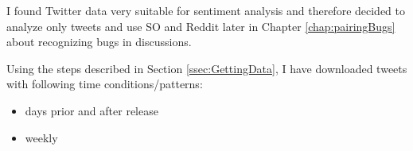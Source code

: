 I found Twitter data very suitable for sentiment analysis and therefore decided to analyze only tweets and use SO and Reddit later in Chapter \ref{chap:pairingBugs}  about recognizing bugs in discussions.

Using the steps described in Section \ref{ssec:GettingData}, I have downloaded tweets with following time conditions/patterns:
\begin{itemize}
\item days prior and after release
\item weekly
\end{itemize}

